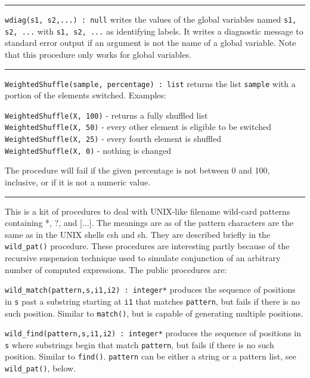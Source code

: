 \vspace{0.25cm}\hrule{}

\texttt{wdiag(s1, s2,...) : null} writes the values of the global
variables named \texttt{s1, s2, ...} with \texttt{s1, s2, ...} as
identifying labels. It writes a diagnostic message to standard error
output if an argument is not the name of a global variable. Note that
this procedure only works for global variables. 

\vspace{0.25cm}\hrule{}

\texttt{WeightedShuffle(sample, percentage) : list} returns the list
\texttt{sample} with a portion of the elements switched. Examples:

\texttt{WeightedShuffle(X, 100)} - returns a fully shuffled list\\
\texttt{WeightedShuffle(X, 50)} - every other element is eligible to be
switched\\
\texttt{WeightedShuffle(X, 25)} - every fourth element is
shuffled\\
\texttt{WeightedShuffle(X, 0)} - nothing is changed

The procedure will fail if the given percentage is not between 0 and
100, inclusive, or if it is not a numeric value.

\vspace{0.25cm}\hrule{}

This is a kit of procedures to deal with UNIX-like filename
wild-card patterns containing *, ?, and
[...]. The meanings are as of the pattern characters are the same as in
the UNIX shells csh and sh. They are described briefly in the
\texttt{wild\_pat()} procedure. These procedures are interesting partly
because of the {\textquotedbl}recursive suspension{\textquotedbl}
technique used to simulate conjunction of an arbitrary number of
computed expressions. The public procedures are:

\texttt{wild\_match(pattern,s,i1,i2) : integer*} produces the sequence
of positions in \texttt{s} past a substring starting at \texttt{i1}
that matches \texttt{pattern}, but fails if there is no such position.
Similar to \texttt{match()}, but is capable of generating multiple
positions.

\texttt{wild\_find(pattern,s,i1,i2) : integer*} produces the sequence of
positions in \texttt{s} where substrings begin that match
\texttt{pattern}, but fails if there is no such position. Similar to
\texttt{find()}. \texttt{pattern} can be either a string or a pattern
list, see \texttt{wild\_pat()}, below.

